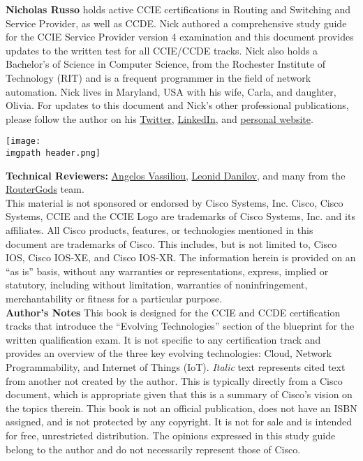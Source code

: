 \noindent
\textbf{Nicholas Russo} holds active CCIE certifications in Routing and
Switching and Service Provider, as well as CCDE. Nick authored a comprehensive
study guide for the CCIE Service Provider version 4 examination and this
document provides updates to the written test for all CCIE/CCDE tracks. Nick
also holds a Bachelor’s of Science in Computer Science, from the Rochester
Institute of Technology (RIT) and is a frequent programmer in the field of
network automation. Nick lives in Maryland, USA with his wife, Carla, and
daughter, Olivia. For updates to this document and Nick’s other professional
publications, please follow the author on his
\href{https://twitter.com/nickrusso42518}{Twitter},
\href{https://www.linkedin.com/in/njrusmc}{LinkedIn}, and
\href{http://njrusmc.net}{personal website}. \\

    \begin{minipage}[t]{\linewidth}
	  \centering
      \texttt{[image: \\imgpath header.png]}
    \end{minipage}

\textbf{Technical Reviewers:}
\href{https://twitter.com/ipmess}{Angelos Vassiliou},
\href{https://twitter.com/iosxrqna}{Leonid Danilov}, and many from the
\href{https://www.meetup.com/routergods}{RouterGods} team. \\

This material is not sponsored or endorsed by Cisco Systems, Inc. Cisco, Cisco
Systems, CCIE and the CCIE Logo are trademarks of Cisco Systems, Inc. and its
affiliates. All Cisco products, features, or technologies mentioned in this
document are trademarks of Cisco. This includes, but is not limited to, Cisco
IOS, Cisco IOS-XE, and Cisco IOS-XR. The information herein is provided on an
``as is'' basis, without any warranties or representations, express, implied or
statutory, including without limitation, warranties of noninfringement,
merchantability or fitness for a particular purpose. \\

\textbf{Author’s Notes}
This book is designed for the CCIE and CCDE certification tracks that
introduce the ``Evolving Technologies'' section of the blueprint for the written
qualification exam. It is not specific to any certification track and provides
an overview of the three key evolving technologies: Cloud, Network
Programmability, and Internet of Things (IoT). \textit{Italic} text represents
cited text from another not created by the author. This is typically directly
from a Cisco document, which is appropriate given that this is a summary of
Cisco’s vision on the topics therein. This book is not an official
publication, does not have an ISBN assigned, and is not protected by any
copyright. It is not for sale and is intended for free, unrestricted
distribution. The opinions expressed in this study guide belong to the author
and do not necessarily represent those of Cisco. \\

